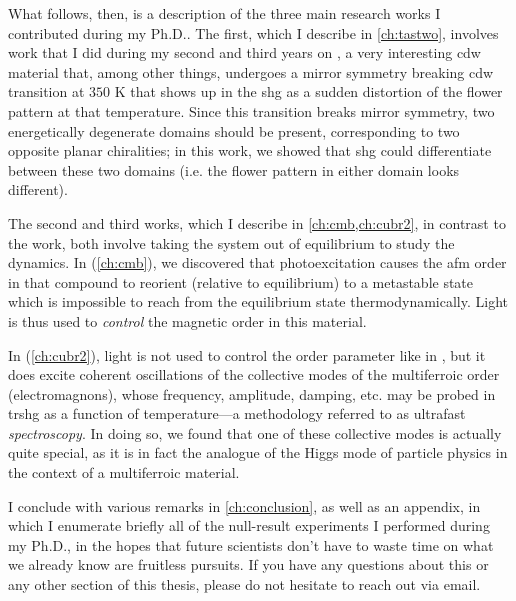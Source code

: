 What follows, then, is a description of the three main research works I contributed during my Ph.D..
The first, which I describe in \cref{ch:tastwo}, involves work that I did during my second and third years on \tastwo, a very interesting \gls{cdw} material that, among other things, undergoes a mirror symmetry breaking \gls{cdw} transition at $350$ \si{K} that shows up in the \gls{shg} as a sudden distortion of the flower pattern at that temperature.
Since this transition breaks mirror symmetry, two energetically degenerate domains should be present, corresponding to two opposite planar chiralities; in this work, we showed that \gls{shg} could differentiate between these two domains (i.e. the flower pattern in either domain looks different).

The second and third works, which I describe in \cref{ch:cmb,ch:cubr2}, in contrast to the \tastwo work, both involve taking the system out of equilibrium to study the dynamics.
In  (\cref{ch:cmb}), we discovered that photoexcitation causes the \gls{afm} order in that compound to reorient (relative to equilibrium) to a metastable state which is impossible to reach from the equilibrium state thermodynamically.
Light is thus used to \textit{control} the magnetic order in this material.

In  (\cref{ch:cubr2}), light is not used to control the order parameter like in , but it does excite coherent oscillations of the collective modes of the multiferroic order (electromagnons), whose frequency, amplitude, damping, etc. may be probed in \gls{trshg} as a function of temperature---a methodology referred to as ultrafast \textit{spectroscopy}.
In doing so, we found that one of these collective modes is actually quite special, as it is in fact the analogue of the Higgs mode of particle physics in the context of a multiferroic material.

I conclude with various remarks in \cref{ch:conclusion}, as well as an appendix, in which I enumerate briefly all of the null-result experiments I performed during my Ph.D., in the hopes that future scientists don't have to waste time on what we already know are fruitless pursuits.
If you have any questions about this or any other section of this thesis, please do not hesitate to reach out via email.
